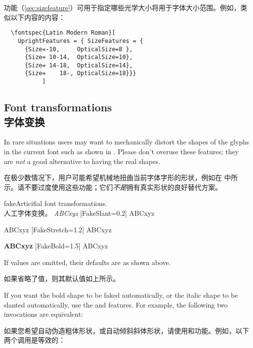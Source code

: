\documentclass[a4paper]{l3doc}
\begin{document}
功能（\vref{sec:sizefeature}）可用于指定哪些光学大小将用于字体大小范围。例如，类似以下内容的内容：

\begin{Verbatim}
  \fontspec{Latin Modern Roman}[
    UprightFeatures = { SizeFeatures = {
      {Size=-10,     OpticalSize=8 },
      {Size= 10-14,  OpticalSize=10},
      {Size= 14-18,  OpticalSize=14},
      {Size=    18-, OpticalSize=18}}}
           ]
\end{Verbatim}

\subsection{Font transformations\\字体变换}

In rare situations users may want to mechanically distort the shapes of the glyphs in the current font such as shown in . Please don't overuse these features; they are \emph{not} a good alternative to having the real shapes.

在极少数情况下，用户可能希望机械地扭曲当前字体字形的形状，例如在  中所示。请不要过度使用这些功能；它们\emph{不是}拥有真实形状的良好替代方案。


\begin{Xexample}{fake}{Articifial font transformations.\\人工字体变换。}
   \emph{ABCxyz} \quad
  [FakeSlant=0.2] ABCxyz

    ABCxyz \quad
  [FakeStretch=1.2] ABCxyz

   \textbf{ABCxyz} \quad
  [FakeBold=1.5] ABCxyz
\end{Xexample}

If values are omitted, their defaults are as shown above.

如果省略了值，则其默认值如上所示。

If you want the bold shape to be faked automatically, or the italic shape
to be slanted automatically, use the  and
 features. For example, the following two invocations
are equivalent:

如果您希望自动伪造粗体形状，或自动倾斜斜体形状，请使用和功能。例如，以下两个调用是等效的：
\end{document}

